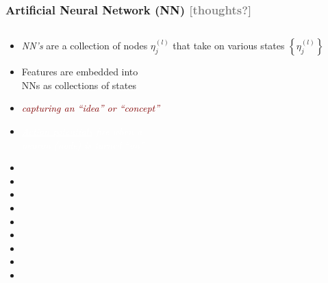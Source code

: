 \documentclass[xcolor={dvipsnames}]{beamer}
\begin{document}
\frame
{
\frametitle{Artificial Neural Network (NN) \textcolor{gray}{[thoughts?]}}

\begin{columns}
\begin{column}{.6\textwidth}
\begin{itemize}
\item  \emph{NN's} are a collection of nodes $\eta^{(l)}_j$ that take on various states $\left\{\eta^{(l)}_j\right\}$
\item Features are embedded into\\ NNs as collections of states  
\item<1->[] \textcolor{Maroon}{\emph{capturing an ``idea'' or ``concept''}}
\item[] \textcolor{White}{
\emph{\underline{Action potentials} fire when a \\ neuron (node) is turned ``on''}}
\item[]
\item[]
\item[]
\item[]
\item[]
\item[]
\item[]
\item[]
\item[]
\end{itemize}
\end{column}
\begin{column}{.5\textwidth}

\vspace{-2em}


\vspace{.25em}
\end{column}
\end{columns}

}
\end{document}
